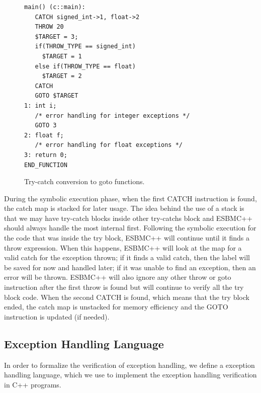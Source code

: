 \documentclass[conference]{IEEEtran}
\begin{document}
{\begin{figure}[ht]
\centering
\begin{minipage}{1.0\textwidth}
\begin{lstlisting}
main() (c::main):
   CATCH signed_int->1, float->2
   THROW 20
   $TARGET = 3;
   if(THROW_TYPE == signed_int)
     $TARGET = 1
   else if(THROW_TYPE == float)
     $TARGET = 2
   CATCH
   GOTO $TARGET
1: int i;
   /* error handling for integer exceptions */
   GOTO 3
2: float f;
   /* error handling for float exceptions */
3: return 0;
END_FUNCTION
\end{lstlisting}
\end{minipage}
\caption{Try-catch conversion to goto functions.}
\label{figure:try-catch-goto}
\end{figure}

During the symbolic execution phase, when the first
CATCH instruction is found, the catch map is stacked
for later usage. The idea behind the use of a stack is
that we may have try-catch blocks inside other
try-catchs block and ESBMC++ should always handle
the most internal first. Following the symbolic execution
for the code that was inside the try block, ESBMC++ will continue
until it finds a throw expression. When this happens, ESBMC++ will
look at the map for a valid catch for the exception thrown; if it finds
a valid catch, then the label will be saved for now and handled later;
if it was unable to find an exception, then an error will be thrown.
ESBMC++ will also ignore any other throw or goto instruction after
the first throw is found but will continue to verify all the try
block code. When the second CATCH is found, which means that the try
block ended, the catch map is unstacked for memory efficiency
and the GOTO instruction is updated (if needed).

\subsection{Exception Handling Language}

In order to formalize the verification of exception handling, we
define a exception handling language, which we use to implement
the exception handling verification in C++ programs.

}
\end{document}
